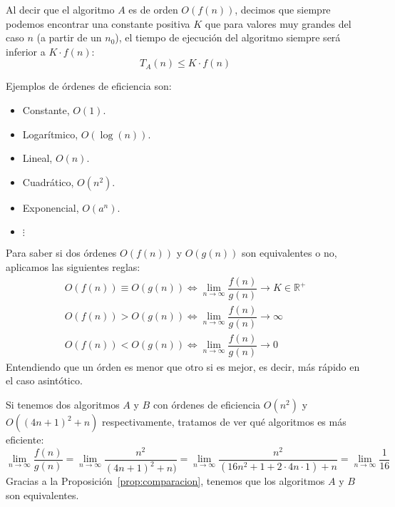 Al decir que el algoritmo $A$ es de orden $O(f(n))$, decimos que siempre podemos encontrar una constante positiva $K$ que para valores muy grandes del caso $n$ (a partir de un $n_0$), el tiempo de ejecución del algoritmo siempre será inferior a $K \cdot f(n)$:
\begin{equation*}
T_A(n) \leq K \cdot f(n)
\end{equation*}

Ejemplos de órdenes de eficiencia son:
\begin{itemize}
    \item Constante, $O(1)$.
    \item Logarítmico, $O(\log(n))$.
    \item Lineal, $O(n)$.
    \item Cuadrático, $O(n^2)$.
    \item Exponencial, $O(a^n)$.
    \item $\vdots$
\end{itemize}

\begin{prop}\label{prop:comparacion}
Para saber si dos órdenes $O(f(n))$ y $O(g(n))$ son equivalentes o no, aplicamos las siguientes reglas:
\begin{gather*}
O(f(n)) \equiv O(g(n)) \Leftrightarrow \lim_{n \to \infty} \dfrac{f(n)}{g(n)} \rightarrow K \in \mathbb{R}^{+}\\
O(f(n)) > O(g(n)) \Leftrightarrow \lim_{n \to \infty} \dfrac{f(n)}{g(n)} \rightarrow \infty\\
O(f(n)) < O(g(n)) \Leftrightarrow \lim_{n \to \infty} \dfrac{f(n)}{g(n)} \rightarrow 0
\end{gather*}
Entendiendo que un órden es menor que otro si es mejor, es decir, más rápido en el caso asintótico.
\end{prop}

\begin{ejemplo}
Si tenemos dos algoritmos $A$ y $B$ con órdenes de eficiencia $O(n^2)$ y $O((4n+1)^2+n)$ respectivamente, tratamos de ver qué algoritmos es más eficiente:
\begin{equation*}
\lim_{n\to \infty} \dfrac{f(n)}{g(n)} = \lim_{n\to\infty}\dfrac{n^2}{(4n+1)^2+n)} = \lim_{n\to\infty}\dfrac{n^2}{(16n^2 +1+2\cdot 4n\cdot 1)+n} = \lim_{n\to\infty}\dfrac{1}{16}
\end{equation*}
Gracias a la Proposición~\ref{prop:comparacion}, tenemos que los algoritmos $A$ y $B$ son equivalentes.
\end{ejemplo}

